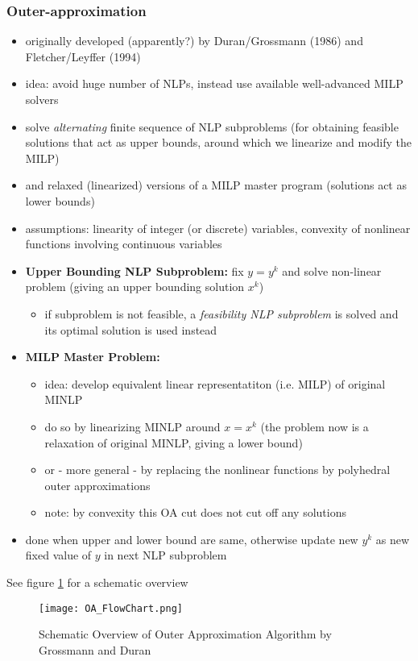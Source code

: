 \documentclass{article}
\begin{document}
\subsubsection{Outer-approximation}
\begin{itemize}
\item originally developed (apparently?) by Duran/Grossmann (1986) and Fletcher/Leyffer (1994)
\item idea: avoid huge number of NLPs, instead use available well-advanced MILP solvers
\item solve \emph{alternating} finite sequence of NLP subproblems (for obtaining feasible solutions that act as upper bounds, around which we linearize and modify the MILP)
\item and relaxed (linearized) versions of a MILP master program (solutions act as lower bounds)
\item assumptions: linearity of integer (or discrete) variables, convexity of nonlinear functions involving continuous variables
\item \textbf{Upper Bounding NLP Subproblem:} fix $y=y^k$ and solve non-linear problem (giving an upper bounding solution $x^k$)
	\begin{itemize}
	\item if subproblem is not feasible, a \emph{feasibility NLP subproblem} is solved and its optimal solution is used instead
	\end{itemize}
\item \textbf{MILP Master Problem:} 
	\begin{itemize}
	\item idea: develop equivalent linear representatiton (i.e. MILP) of original MINLP
	\item do so by linearizing MINLP around $x=x^k$ (the problem now is a relaxation of original MINLP, giving a lower bound)
	\item or - more general - by replacing the nonlinear functions by polyhedral outer approximations
	 \item note: by convexity this OA cut does not cut off any solutions
	\end{itemize}
\item done when upper and lower bound are same, otherwise update new $y^k$ as new fixed value of $y$ in next NLP subproblem
\end{itemize}
See figure \ref{fig:OA_FlowChart} for a schematic overview

\begin{figure}[htb]
\centering
\texttt{[image: OA\_FlowChart.png]}
\caption{Schematic Overview of Outer Approximation Algorithm by Grossmann and Duran}
\label{fig:OA_FlowChart}
\end{figure}
\end{document}
